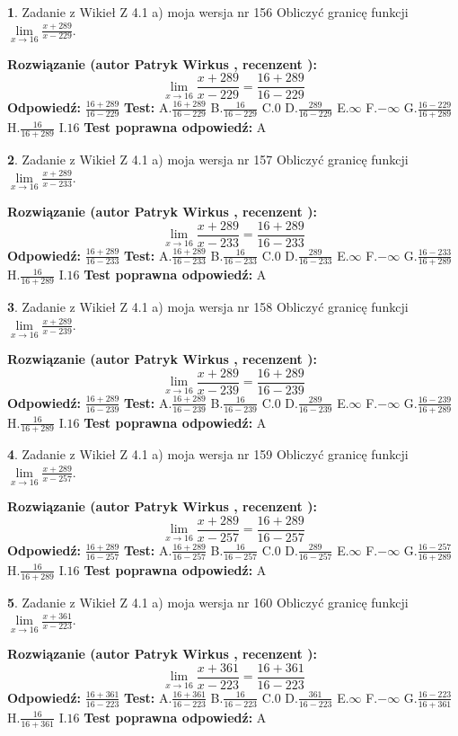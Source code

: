 \documentclass[12pt, a4paper]{article}
\theoremstyle{definition} %
\newtheorem{zad}{}
\newcommand{\zadStart}[1]{\begin{zad}#1\newline}
\newcommand{\zadStop}{\end{zad}}
\newcommand{\rozwStart}[2]{\noindent \textbf{Rozwiązanie (autor #1 , recenzent #2): }\newline}
\newcommand{\rozwStop}{\newline}
\newcommand{\odpStart}{\noindent \textbf{Odpowiedź:}\newline}
\newcommand{\odpStop}{\newline}
\newcommand{\testStart}{\noindent \textbf{Test:}\newline}
\newcommand{\testStop}{\newline}
\newcommand{\kluczStart}{\noindent \textbf{Test poprawna odpowiedź:}\newline}
\newcommand{\kluczStop}{\newline}
\begin{document}
\zadStart{Zadanie z Wikieł Z 4.1 a) moja wersja nr 156}
Obliczyć granicę funkcji $\lim\limits_{x\to16}\frac{x+289}{x-229}$.
\zadStop
\rozwStart{Patryk Wirkus}{}
$$\lim\limits_{x\to16}\frac{x+289}{x-229} = \frac{16+289}{16-229}$$
\rozwStop
\odpStart
$\frac{16+289}{16-229}$
\odpStop
\testStart
A.$\frac{16+289}{16-229}$
B.$\frac{16}{16-229}$
C.$0$
D.$\frac{289}{16-229}$
E.$\infty$
F.$-\infty$
G.$\frac{16-229}{16+289}$
H.$\frac{16}{16+289}$
I.$16$
\testStop
\kluczStart
A
\kluczStop



\zadStart{Zadanie z Wikieł Z 4.1 a) moja wersja nr 157}
Obliczyć granicę funkcji $\lim\limits_{x\to16}\frac{x+289}{x-233}$.
\zadStop
\rozwStart{Patryk Wirkus}{}
$$\lim\limits_{x\to16}\frac{x+289}{x-233} = \frac{16+289}{16-233}$$
\rozwStop
\odpStart
$\frac{16+289}{16-233}$
\odpStop
\testStart
A.$\frac{16+289}{16-233}$
B.$\frac{16}{16-233}$
C.$0$
D.$\frac{289}{16-233}$
E.$\infty$
F.$-\infty$
G.$\frac{16-233}{16+289}$
H.$\frac{16}{16+289}$
I.$16$
\testStop
\kluczStart
A
\kluczStop



\zadStart{Zadanie z Wikieł Z 4.1 a) moja wersja nr 158}
Obliczyć granicę funkcji $\lim\limits_{x\to16}\frac{x+289}{x-239}$.
\zadStop
\rozwStart{Patryk Wirkus}{}
$$\lim\limits_{x\to16}\frac{x+289}{x-239} = \frac{16+289}{16-239}$$
\rozwStop
\odpStart
$\frac{16+289}{16-239}$
\odpStop
\testStart
A.$\frac{16+289}{16-239}$
B.$\frac{16}{16-239}$
C.$0$
D.$\frac{289}{16-239}$
E.$\infty$
F.$-\infty$
G.$\frac{16-239}{16+289}$
H.$\frac{16}{16+289}$
I.$16$
\testStop
\kluczStart
A
\kluczStop



\zadStart{Zadanie z Wikieł Z 4.1 a) moja wersja nr 159}
Obliczyć granicę funkcji $\lim\limits_{x\to16}\frac{x+289}{x-257}$.
\zadStop
\rozwStart{Patryk Wirkus}{}
$$\lim\limits_{x\to16}\frac{x+289}{x-257} = \frac{16+289}{16-257}$$
\rozwStop
\odpStart
$\frac{16+289}{16-257}$
\odpStop
\testStart
A.$\frac{16+289}{16-257}$
B.$\frac{16}{16-257}$
C.$0$
D.$\frac{289}{16-257}$
E.$\infty$
F.$-\infty$
G.$\frac{16-257}{16+289}$
H.$\frac{16}{16+289}$
I.$16$
\testStop
\kluczStart
A
\kluczStop



\zadStart{Zadanie z Wikieł Z 4.1 a) moja wersja nr 160}
Obliczyć granicę funkcji $\lim\limits_{x\to16}\frac{x+361}{x-223}$.
\zadStop
\rozwStart{Patryk Wirkus}{}
$$\lim\limits_{x\to16}\frac{x+361}{x-223} = \frac{16+361}{16-223}$$
\rozwStop
\odpStart
$\frac{16+361}{16-223}$
\odpStop
\testStart
A.$\frac{16+361}{16-223}$
B.$\frac{16}{16-223}$
C.$0$
D.$\frac{361}{16-223}$
E.$\infty$
F.$-\infty$
G.$\frac{16-223}{16+361}$
H.$\frac{16}{16+361}$
I.$16$
\testStop
\kluczStart
A
\kluczStop
\end{document}
